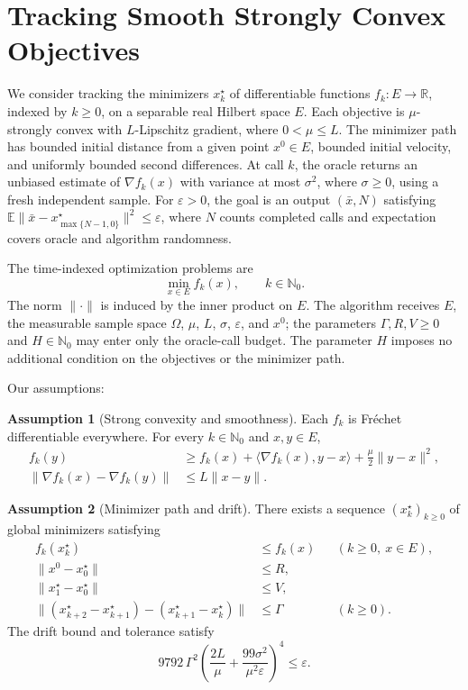 \documentclass[10pt]{article}
\theoremstyle{definition}
\newtheorem{assumption}{Assumption}
\begin{document}
\section*{Tracking Smooth Strongly Convex Objectives}
We consider tracking the minimizers $x_k^\star$ of differentiable functions $f_k:E\to\mathbb{R}$, indexed by $k\geq0$, on a separable real Hilbert space $E$. Each objective is $\mu$-strongly convex with $L$-Lipschitz gradient, where $0<\mu\leq L$. The minimizer path has bounded initial distance from a given point $x^0\in E$, bounded initial velocity, and uniformly bounded second differences. At call $k$, the oracle returns an unbiased estimate of $\nabla f_k(x)$ with variance at most $\sigma^2$, where $\sigma\geq0$, using a fresh independent sample. For $\varepsilon>0$, the goal is an output $(\bar{x},N)$ satisfying $\mathbb{E}\|\bar{x}-x_{\max\{N-1,0\}}^\star\|^2\leq\varepsilon$, where $N$ counts completed calls and expectation covers oracle and algorithm randomness.

The time-indexed optimization problems are
\[
\min_{x\in E} f_k(x),\qquad k\in\mathbb{N}_0.
\]
The norm $\|\cdot\|$ is induced by the inner product on $E$. The algorithm receives $E$, the measurable sample space $\Omega$, $\mu$, $L$, $\sigma$, $\varepsilon$, and $x^0$; the parameters $\Gamma,R,V\geq0$ and $H\in\mathbb{N}_0$ may enter only the oracle-call budget. The parameter $H$ imposes no additional condition on the objectives or the minimizer path.

Our assumptions:
\begin{assumption}[Strong convexity and smoothness]
Each $f_k$ is Fr\'echet differentiable everywhere. For every $k\in\mathbb{N}_0$ and $x,y\in E$,
\[
\begin{aligned}
f_k(y)&\geq f_k(x)+\langle\nabla f_k(x),y-x\rangle
             +\frac{\mu}{2}\|y-x\|^2,\\
\|\nabla f_k(x)-\nabla f_k(y)\|&\leq L\|x-y\|.
\end{aligned}
\]
\end{assumption}

\begin{assumption}[Minimizer path and drift]
There exists a sequence $(x_k^\star)_{k\geq0}$ of global minimizers satisfying
\[
\begin{aligned}
f_k(x_k^\star)&\leq f_k(x) &&(k\geq0,\ x\in E),\\
\|x^0-x_0^\star\|&\leq R,\\
\|x_1^\star-x_0^\star\|&\leq V,\\
\|(x_{k+2}^\star-x_{k+1}^\star)
 -(x_{k+1}^\star-x_k^\star)\|&\leq\Gamma &&(k\geq0).
\end{aligned}
\]
The drift bound and tolerance satisfy
\[
9792\,\Gamma^2
\left(\frac{2L}{\mu}
      +\frac{99\sigma^2}{\mu^2\varepsilon}\right)^4
\leq\varepsilon.
\]
\end{assumption}
\end{document}
